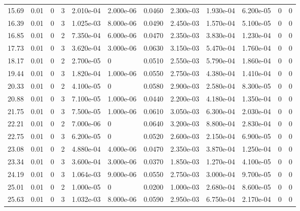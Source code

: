 \documentclass[preview]{standalone}
\begin{document}
{{\begin{tabular}{L{1.2cm}C{1.2cm} C{0.3cm}C{0.5cm} C{1.4cm}C{1.4cm} C{1.4cm}C{1.4cm} C{1.6cm}C{1.6cm} C{1.6cm}C{1.6cm}}
  15.69  &  0.01  & 0     &  3 &  2.010e-04  & 2.000e-06  &  0.0460&   2.300e-03& 1.930e-04 & 6.200e-05   &  0 & 0  \\ 
  16.39  &  0.01  & 0     &  3 &  1.025e-03  & 8.000e-06  &  0.0490&   2.450e-03& 1.570e-04 & 5.100e-05   &  0 & 0  \\ 
  16.85  &  0.01  & 0     &  2 &  7.350e-04  & 6.000e-06  &  0.0470&   2.350e-03& 3.830e-04 & 1.230e-04   &  0 & 0  \\ 
  17.73  &  0.01  & 0     &  3 &  3.620e-04  & 3.000e-06  &  0.0630&   3.150e-03& 5.470e-04 & 1.760e-04   &  0 & 0  \\ 
  18.17  &  0.01  & 0     &  2 &  2.700e-05  & 0  &  0.0510&   2.550e-03& 5.790e-04 & 1.860e-04   &  0 & 0  \\ 
  19.44  &  0.01  & 0     &  3 &  1.820e-04  & 1.000e-06  &  0.0550&   2.750e-03& 4.380e-04 & 1.410e-04   &  0 & 0  \\ 
  20.33  &  0.01  & 0     &  2 &  4.100e-05  & 0  &  0.0580&   2.900e-03& 2.580e-04 & 8.300e-05   &  0 & 0  \\ 
  20.88  &  0.01  & 0     &  3 &  7.100e-05  & 1.000e-06  &  0.0440&   2.200e-03& 4.180e-04 & 1.350e-04   &  0 & 0  \\ 
  21.75  &  0.01  & 0     &  3 &  7.500e-05  & 1.000e-06  &  0.0610&   3.050e-03& 6.300e-04 & 2.030e-04   &  0 & 0  \\ 
  22.21  &  0.01  & 0     &  2 &  7.000e-06  & 0  &  0.0640&   3.200e-03& 8.800e-04 & 2.830e-04   &  0 & 0  \\ 
  22.75  &  0.01  & 0     &  3 &  6.200e-05  & 0  &  0.0520&   2.600e-03& 2.150e-04 & 6.900e-05   &  0 & 0  \\ 
  23.08  &  0.01  & 0     &  2 &  4.880e-04  & 4.000e-06  &  0.0470&   2.350e-03& 3.870e-04 & 1.250e-04   &  0 & 0  \\ 
  23.34  &  0.01  & 0     &  3 &  3.600e-04  & 3.000e-06  &  0.0370&   1.850e-03& 1.270e-04 & 4.100e-05   &  0 & 0  \\ 
  24.19  &  0.01  & 0     &  3 &  1.064e-03  & 9.000e-06  &  0.0550&   2.750e-03& 3.000e-04 & 9.700e-05   &  0 & 0  \\ 
  25.01  &  0.01  & 0     &  2 &  1.000e-05  & 0  &  0.0200&   1.000e-03& 2.680e-04 & 8.600e-05   &  0 & 0  \\ 
  25.63  &  0.01  & 0     &  3 &  1.032e-03  & 8.000e-06  &  0.0590&   2.950e-03& 6.750e-04 & 2.170e-04   &  0 & 0  \\ 
\hline 
\end{tabular} 

}}
\end{document}
